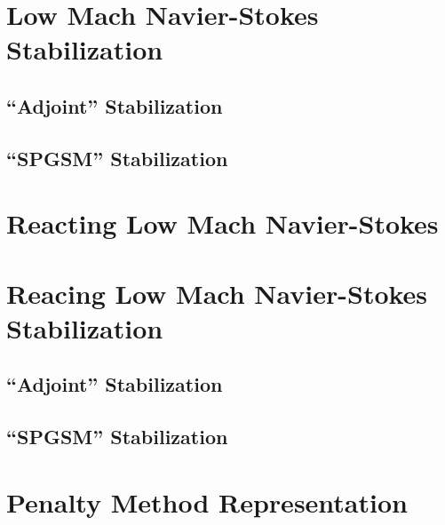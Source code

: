 \documentclass[twoside]{report}
\begin{document}
\chapter{Low Mach Navier-Stokes Stabilization}
\section{``Adjoint'' Stabilization}
\section{``SPGSM'' Stabilization}

\chapter{Reacting Low Mach Navier-Stokes}

\chapter{Reacing Low Mach Navier-Stokes Stabilization}
\section{``Adjoint'' Stabilization}
\section{``SPGSM'' Stabilization}

\chapter{Penalty Method Representation}




\end{document}
